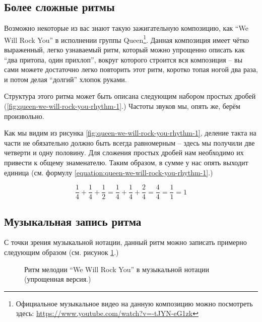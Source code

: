 \documentclass[../sparc.tex]{subfiles}
\begin{document}
\subsection{Более сложные ритмы}

Возможно некоторые из вас знают такую зажигательную композицию, как ``We Will
Rock You'' в исполнении группы Queen\footnote{Официальное музыкальное видео на
данную композицию можно посмотреть здесь:
\url{https://www.youtube.com/watch?v=-tJYN-eG1zk}}. Данная композиция имеет
чётко выраженный, легко узнаваемый ритм, который можно упрощенно описать как
``два притопа, один прихлоп'', вокруг которого строится вся композиция -- вы сами
можете достаточно легко повторить этот ритм, коротко топая ногой два раза, и
потом делая ``долгий'' хлопок руками.


Структура этого ритма может быть описана следующим набором простых дробей
(\ref{fig:queen-we-will-rock-you-rhythm-1}.) Частоты звуков мы, опять же, берём
произвольно.

Как мы видим из рисунка \ref{fig:queen-we-will-rock-you-rhythm-1}, деление такта
на части не обязательно должно быть всегда равномерным -- здесь мы получили две
четверти и одну половину.  Для сложения простых дробей нам необходимо их
привести к общему знаменателю.  Таким образом, в сумме у нас опять выходит
единица (см. формулу \ref{equation:queen-we-will-rock-you-rhythm-1}.)

\begin{equation}
  \frac{1}{4} + \frac{1}{4} + \frac{1}{2} = \frac{1}{4} + \frac{1}{4} + \frac{2}{4} = \frac{4}{4} = \frac{1}{1} = 1
  \label{equation:queen-we-will-rock-you-rhythm-1}
\end{equation}

\subsection{Музыкальная запись ритма}

С точки зрения музыкальной нотации, данный ритм можно записать примерно
следующим образом (см. рисунок \ref{fig:lilypond-queen-1}.)

\begin{figure}[ht]
  \centering
  \caption{Ритм мелодии ``We Will Rock You'' в музыкальной нотации (упрощенная версия.)}
  \label{fig:lilypond-queen-1}
\end{figure}
\end{document}
